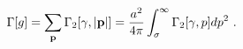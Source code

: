 \begin{equation}\label{1.16}
\Gamma[g]=\sum_{\bf p} \Gamma_2[\gamma,|{\bf p}|]
={a^2 \over 4\pi}\int^\infty_\sigma \Gamma_2[\gamma,p] dp^2 ~.
\end{equation}

